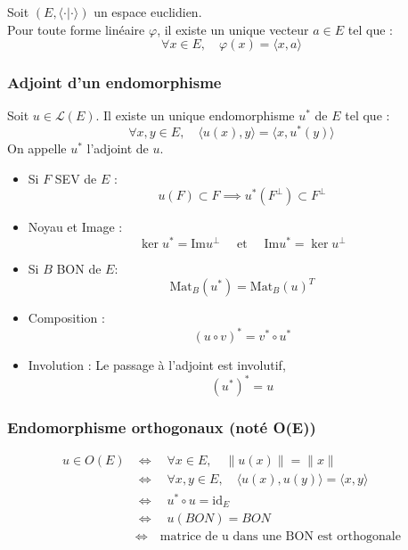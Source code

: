 \documentclass[a4paper,12pt]{report}
\newcommand{\Def}[2]{\begin{tcolorbox}[colback=white,colframe=CornflowerBlue, title=Définition : #1]#2\end{tcolorbox}}
\newcommand{\Thm}[2]{\begin{tcolorbox}[colback=white,colframe=Red!60, title=Théorème : #1]#2\end{tcolorbox}}
\newcommand{\ssi}{\Longleftrightarrow}
\begin{document}
\Thm{Représentation des formes linéaires}{
Soit $(E, \langle \cdot | \cdot \rangle)$ un espace euclidien. \\Pour toute forme linéaire $\varphi$, il existe un unique vecteur $a \in E$ tel que :
    \[ \forall x \in E, \quad \varphi(x) = \langle x , a \rangle \]
}

\subsubsection{Adjoint d'un endomorphisme}

\Def{Adjoint d'un endomorphisme}{
Soit $u \in \mathcal{L}(E)$. Il existe un unique endomorphisme $u^*$ de $E$ tel que :
\[
\forall x, y \in E, \quad \langle u(x), y \rangle = \langle x, u^*(y) \rangle
\]
On appelle $u^*$ l'adjoint de $u$.
}

\Thm{Propriétés de l'Adjoint (Stabilité Noyau Matrice Composition Involution)}{
\begin{itemize}
    \item Si $F$ SEV de $E$ : \quad\[u(F) \subset F \implies u^*(F^\perp) \subset F^\perp\]
    \item Noyau et Image : \[\ker u^* = \mathrm{Im}u ^{\perp} \quad \text{ et } \quad \mathrm{Im}u^* = \ker u ^{\perp}\]
    \item Si $B$ BON de $E$: \quad\[\mathrm{Mat}_B(u^*) = \mathrm{Mat}_B(u)^T\]
    \item Composition :
        \[ (u \circ v)^* = v^* \circ u^* \]
    \item Involution : Le passage à l'adjoint est involutif,
        \[ (u^*)^* = u \]
\end{itemize}
}

\subsubsection{Endomorphisme orthogonaux (noté O(E))}

\Def{Caractérisation des isométries vectorielles (1 def. + 4 caract.)}{
\begin{align*}
u \in O(E) 
    &\ssi  \quad \forall x \in E, \quad \|u(x)\| = \|x\|\\
    &\ssi \quad \forall x, y \in E, \quad \langle u(x), u(y) \rangle = \langle x, y \rangle\\
    &\ssi \quad u^* \circ u = \mathrm{id}_E\\
    &\ssi \quad u(BON) = BON\\
    &\ssi \quad \text{matrice de u dans une BON est orthogonale}\\
\end{align*}
}
\end{document}
